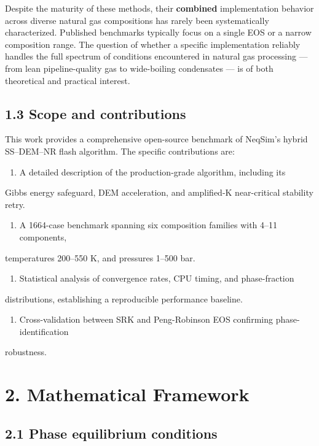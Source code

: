 \documentclass[review,3p]{custom}
\begin{document}
Despite the maturity of these methods, their \textbf{combined} implementation behavior
across diverse natural gas compositions has rarely been systematically characterized.
Published benchmarks typically focus on a single EOS or a narrow composition range.
The question of whether a specific implementation reliably handles the full spectrum
of conditions encountered in natural gas processing — from lean pipeline-quality gas
to wide-boiling condensates — is of both theoretical and practical interest.

\subsection{1.3 Scope and contributions}

This work provides a comprehensive open-source benchmark of NeqSim's hybrid SS–DEM–NR
flash algorithm. The specific contributions are:

\begin{enumerate}
  \item A detailed description of the production-grade algorithm, including its
\end{enumerate}
   Gibbs energy safeguard, DEM acceleration, and amplified-K near-critical
   stability retry.
\begin{enumerate}
  \item A 1664-case benchmark spanning six composition families with 4–11 components,
\end{enumerate}
   temperatures 200–550 K, and pressures 1–500 bar.
\begin{enumerate}
  \item Statistical analysis of convergence rates, CPU timing, and phase-fraction
\end{enumerate}
   distributions, establishing a reproducible performance baseline.
\begin{enumerate}
  \item Cross-validation between SRK and Peng-Robinson EOS confirming phase-identification
\end{enumerate}
   robustness.


\section{2. Mathematical Framework}



\subsection{2.1 Phase equilibrium conditions}
\end{document}
